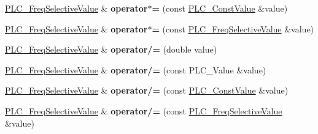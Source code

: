 \begin{DoxyCompactItemize}
\item 
\hypertarget{classns3_1_1PLC__FreqSelectiveValue_a5380173380db6cb5791abe37e75f3290}{\hyperlink{classns3_1_1PLC__FreqSelectiveValue}{\-P\-L\-C\-\_\-\-Freq\-Selective\-Value} \& {\bfseries operator$\ast$=} (const \hyperlink{classns3_1_1PLC__ConstValue}{\-P\-L\-C\-\_\-\-Const\-Value} \&value)}\label{classns3_1_1PLC__FreqSelectiveValue_a5380173380db6cb5791abe37e75f3290}

\item 
\hypertarget{classns3_1_1PLC__FreqSelectiveValue_a9445e49ad51e8818904077ad49d131c7}{\hyperlink{classns3_1_1PLC__FreqSelectiveValue}{\-P\-L\-C\-\_\-\-Freq\-Selective\-Value} \& {\bfseries operator$\ast$=} (const \hyperlink{classns3_1_1PLC__FreqSelectiveValue}{\-P\-L\-C\-\_\-\-Freq\-Selective\-Value} \&value)}\label{classns3_1_1PLC__FreqSelectiveValue_a9445e49ad51e8818904077ad49d131c7}

\item 
\hypertarget{classns3_1_1PLC__FreqSelectiveValue_ac193c5b40dc09c8b9c0d92a8ca4f9bb2}{\hyperlink{classns3_1_1PLC__FreqSelectiveValue}{\-P\-L\-C\-\_\-\-Freq\-Selective\-Value} \& {\bfseries operator/=} (double value)}\label{classns3_1_1PLC__FreqSelectiveValue_ac193c5b40dc09c8b9c0d92a8ca4f9bb2}

\item 
\hypertarget{classns3_1_1PLC__FreqSelectiveValue_a96c017c9bd2c7e9ec1e4a0c7e055d5bb}{\hyperlink{classns3_1_1PLC__FreqSelectiveValue}{\-P\-L\-C\-\_\-\-Freq\-Selective\-Value} \& {\bfseries operator/=} (const \-P\-L\-C\-\_\-\-Value \&value)}\label{classns3_1_1PLC__FreqSelectiveValue_a96c017c9bd2c7e9ec1e4a0c7e055d5bb}

\item 
\hypertarget{classns3_1_1PLC__FreqSelectiveValue_a95797fab6fbf7387c97969dcbf21ef21}{\hyperlink{classns3_1_1PLC__FreqSelectiveValue}{\-P\-L\-C\-\_\-\-Freq\-Selective\-Value} \& {\bfseries operator/=} (const \hyperlink{classns3_1_1PLC__ConstValue}{\-P\-L\-C\-\_\-\-Const\-Value} \&value)}\label{classns3_1_1PLC__FreqSelectiveValue_a95797fab6fbf7387c97969dcbf21ef21}

\item 
\hypertarget{classns3_1_1PLC__FreqSelectiveValue_aeeae6ad75a128ad709f2a69d033ea558}{\hyperlink{classns3_1_1PLC__FreqSelectiveValue}{\-P\-L\-C\-\_\-\-Freq\-Selective\-Value} \& {\bfseries operator/=} (const \hyperlink{classns3_1_1PLC__FreqSelectiveValue}{\-P\-L\-C\-\_\-\-Freq\-Selective\-Value} \&value)}\label{classns3_1_1PLC__FreqSelectiveValue_aeeae6ad75a128ad709f2a69d033ea558}

\end{DoxyCompactItemize}
